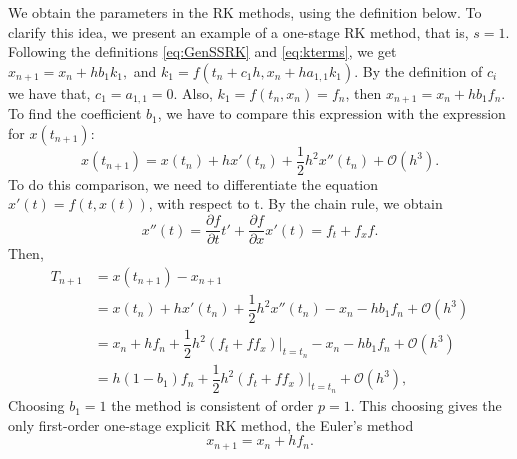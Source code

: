     We obtain the parameters in the RK methods, using the definition below. To clarify this idea, we present an example of a one-stage RK method, that is,
    $s = 1$. Following the definitions \eqref{eq:GenSSRK} and \cref{eq:kterms},
    we get
    $
        x_{n+1} = x_n + hb_1 k_1,
    $
    and
    $
        k_1 = f(t_n + c_1 h, x_n + h a_{1,1} k_1).
    $
    By the definition of $c_i$ we have that, $c_1 = a_{1,1} = 0$. Also, 
    $k_1 = f(t_n,x_n) = f_n$, then $ x_{n+1} = x_n + h b_1 f_n$. To find the
    coefficient $b_1$, we have to compare this expression with the expression for
    $x(t_{n+1})$:
    $$
        x(t_{n+1}) = x(t_n) + hx'(t_n) + \dfrac{1}{2}h^{2}x''(t_n) + \mathcal{O}(h^{3}).
    $$
    To do this comparison, we need to differentiate the equation $x'(t) = f(t,x(t))$, 
    with respect to t. By the chain rule, we obtain
    $$ 
        x''(t) = \dfrac{\partial f}{\partial t}t' + %
                 \dfrac{\partial f}{\partial x}  x'(t) %
            = f_{t} + f_{x} f.
    $$
    Then, 
    \begin{align*}
        T_{n+1}
            &= x(t_{n+1}) - x_{n+1} \\
            &= x(t_n) + hx'(t_n) + \dfrac{1}{2}h^2 x''(t_n)  - x_n - hb_1 f_n +  \mathcal{O}(h^3)\\
            &= x_n + hf_n + \dfrac{1}{2}h^2(f_t + ff_x)\vert_{t = t_n} - x_n - hb_1f_n + \mathcal{O}(h^3)\\
            &= h(1-b_1)f_n + \dfrac{1}{2}h^2(f_t + ff_x)\vert_{t = t_n} + \mathcal{O}(h^3),
    \end{align*}
    Choosing $b_1 = 1$ the method is consistent of order $p=1$. This choosing 
    gives the only first-order one-stage explicit RK method, the Euler's method
    $$
        x_{n+1} = x_n + hf_n.
    $$

